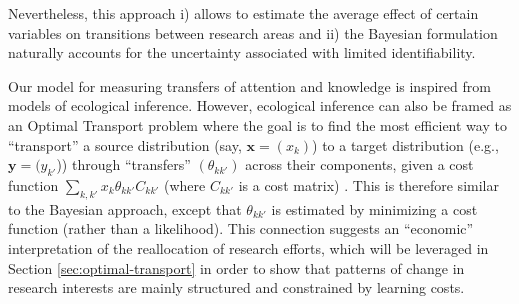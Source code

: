 \documentclass{article}
\begin{document}
Nevertheless, this approach i) allows to estimate the average effect of certain variables on transitions between research areas and ii) the Bayesian formulation naturally accounts for the uncertainty associated with limited identifiability.

Our model for measuring transfers of attention and knowledge is inspired from models of ecological inference. However, ecological inference can also be framed as an Optimal Transport problem \citep{muzellec2017tsallis,li2019learning} where the goal is to find the most efficient way to  ``transport'' a source distribution (say, $\bm{x}=(x_k)$) to a target distribution (e.g., $\bm{y}=(y_{k'}$)) through ``transfers'' $(\theta_{kk'})$ across their components, given a cost function $\sum_{k,k'} x_{k} \theta_{kk'}C_{kk'}$ (where $C_{kk'}$ is a cost matrix) \citep{Peyre2018}. This is therefore similar to the Bayesian approach, except that $\theta_{kk'}$ is estimated by minimizing a cost function (rather than a likelihood). This connection suggests an ``economic'' interpretation of the reallocation of research efforts, which will be leveraged in Section \ref{sec:optimal-transport} in order to show that patterns of change in research interests are mainly structured and constrained by learning costs. %


\end{document}
